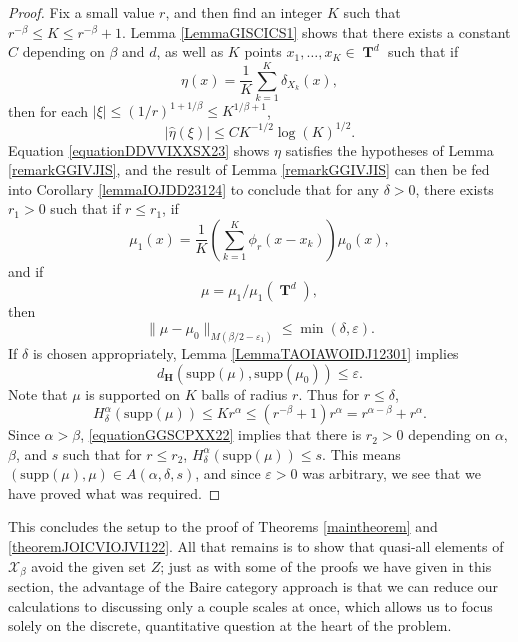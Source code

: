 \documentclass[12pt,reqno]{article}
\numberwithin{equation}{section}
\DeclareMathOperator{\TT}{\mathbf{T}}
\numberwithin{theorem}{section}
\begin{document}
\begin{proof}
    Fix a small value $r$, and then find an integer $K$ such that $r^{-\beta} \leq K \leq r^{-\beta} + 1$. Lemma \ref{LemmaGISCICS1} shows that there exists a constant $C$ depending on $\beta$ and $d$, as well as $K$ points $x_1, \dots, x_K \in \TT^d$ such that if
    \[ \eta(x) = \frac{1}{K} \sum_{k = 1}^K \delta_{X_k}(x), \]
    then for each $|\xi| \leq (1/r)^{1 + 1/\beta} \leq K^{1/\beta + 1}$,
    \begin{equation} \label{equationDDVVIXXSX23}
        |\widehat{\eta}(\xi)| \leq C K^{-1/2} \log(K)^{1/2}.
    \end{equation}
    Equation \eqref{equationDDVVIXXSX23} shows $\eta$ satisfies the hypotheses of Lemma \ref{remarkGGIVJIS}, and the result of Lemma \ref{remarkGGIVJIS} can then be fed into Corollary \ref{lemmaIOJDD23124} to conclude that for any $\delta > 0$, there exists $r_1 > 0$ such that if $r \leq r_1$, if
    \[ \mu_1(x) = \frac{1}{K} \left( \sum_{k = 1}^K \phi_{r}(x - x_k) \right) \mu_0(x), \]
    and if
    \[ \mu = \mu_1 / \mu_1(\TT^d), \]
    then
    \begin{equation} \label{equationYYUDUSC4434}
        \| \mu - \mu_0 \|_{M(\beta/2 - \varepsilon_1)} \leq \min(\delta,\varepsilon).
    \end{equation}
    If $\delta$ is chosen appropriately, Lemma \ref{LemmaTAOIAWOIDJ12301} implies
    \begin{equation}
        d_{\mathbf{H}}(\text{supp}(\mu),\text{supp}(\mu_0)) \leq \varepsilon.
    \end{equation}
    Note that $\mu$ is supported on $K$ balls of radius $r$. Thus for $r \leq \delta$,
    \begin{equation} \label{equationGGSCPXX22}
        H^\alpha_\delta(\text{supp}(\mu)) \leq K r^\alpha \leq (r^{-\beta} + 1) r^\alpha = r^{\alpha - \beta} + r^\alpha.
    \end{equation}
    Since $\alpha > \beta$, \eqref{equationGGSCPXX22} implies that there is $r_2 > 0$ depending on $\alpha$, $\beta$, and $s$ such that for $r \leq r_2$, $H^\alpha_\delta(\text{supp}(\mu)) \leq s$. This means $(\text{supp}(\mu),\mu) \in A(\alpha,\delta,s)$, and since $\varepsilon > 0$ was arbitrary, we see that we have proved what was required.
\end{proof}

This concludes the setup to the proof of Theorems \ref{maintheorem} and \ref{theoremJOICVIOJVI122}. All that remains is to show that quasi-all elements of $\mathcal{X}_\beta$ avoid the given set $Z$; just as with some of the proofs we have given in this section, the advantage of the Baire category approach is that we can reduce our calculations to discussing only a couple scales at once, which allows us to focus solely on the discrete, quantitative question at the heart of the problem.
\end{document}
